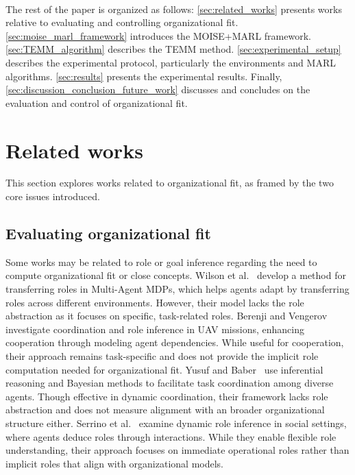 \documentclass[sigconf]{aamas}
\begin{document}
\

\noindent The rest of the paper is organized as follows: \autoref{sec:related_works} presents works relative to evaluating and controlling organizational fit. \autoref{sec:moise_marl_framework} introduces the MOISE+MARL framework. \autoref{sec:TEMM_algorithm} describes the TEMM method. \autoref{sec:experimental_setup} describes the experimental protocol, particularly the environments and MARL algorithms. \autoref{sec:results} presents the experimental results. Finally, \autoref{sec:discussion_conclusion_future_work} discusses and concludes on the evaluation and control of organizational fit.


\section{Related works}
\label{sec:related_works}

This section explores works related to organizational fit, as framed by the two core issues introduced.

\subsection{Evaluating organizational fit}

Some works may be related to role or goal inference regarding the need to compute organizational fit or close concepts.
%
Wilson et al.~\cite{wilson2008learning} develop a method for transferring roles in Multi-Agent MDPs, which helps agents adapt by transferring roles across different environments. However, their model lacks the role abstraction as it focuses on specific, task-related roles.
%
Berenji and Vengerov~\cite{berenji2000learning} investigate coordination and role inference in UAV missions, enhancing cooperation through modeling agent dependencies. While useful for cooperation, their approach remains task-specific and does not provide the implicit role computation needed for organizational fit.
%
Yusuf and Baber~\cite{yusuf2020inferential} use inferential reasoning and Bayesian methods to facilitate task coordination among diverse agents. Though effective in dynamic coordination, their framework lacks role abstraction and does not measure alignment with an broader organizational structure either.
%
Serrino et al.~\cite{serrino2019finding} examine dynamic role inference in social settings, where agents deduce roles through interactions. While they enable flexible role understanding, their approach focuses on immediate operational roles rather than implicit roles that align with organizational models.
\end{document}
